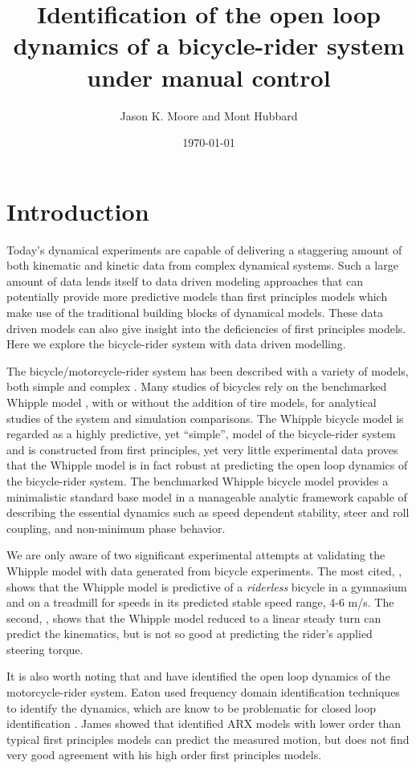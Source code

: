 \documentclass[a4paper]{article}
\title{Identification of the open loop dynamics of a bicycle-rider system under
manual control}
\author{Jason K. Moore and Mont Hubbard}
\date{\today}
\begin{document}
\maketitle

\section{Introduction}

Today's dynamical experiments are capable of delivering a staggering amount of
both kinematic and kinetic data from complex dynamical systems. Such a large
amount of data lends itself to data driven modeling approaches that can
potentially provide more predictive models than first principles models which
make use of the traditional building blocks of dynamical models. These data
driven models can also give insight into the deficiencies of first principles
models. Here we explore the bicycle-rider system with data driven modelling.

The bicycle/motorcycle-rider system has been described with a variety of
models, both simple \cite{Timoshenko1948} and complex \cite{Sharp1971}. Many
studies of bicycles rely on the benchmarked Whipple model \cite{Meijaard2007},
with or without the addition of tire models, for analytical studies of the
system and simulation comparisons. The Whipple bicycle model \cite{Whipple1899}
is regarded as a highly predictive, yet ``simple'', model of the bicycle-rider
system and is constructed from first principles, yet very little experimental
data proves that the Whipple model is in fact robust at predicting the open
loop dynamics of the bicycle-rider system. The benchmarked Whipple bicycle
model \cite{Meijaard2007} provides a minimalistic standard base model in a
manageable analytic framework capable of describing the essential dynamics such
as speed dependent stability, steer and roll coupling, and non-minimum phase
behavior.

We are only aware of two significant experimental attempts at validating the
Whipple model with data generated from bicycle experiments. The most cited,
\cite{Kooijman2008,Kooijman2009}, shows that the Whipple model is predictive of
a \emph{riderless} bicycle in a gymnasium and on a treadmill for speeds in its
predicted stable speed range, 4-6 m/s. The second, \cite{Cain2012}, shows that
the Whipple model reduced to a linear steady turn can predict the kinematics,
but is not so good at predicting the rider's applied steering torque.

It is also worth noting that \cite{Eaton1973} and \cite{James2002,James2005}
have identified the open loop dynamics of the motorcycle-rider system. Eaton
used frequency domain identification techniques to identify the dynamics, which
are know to be problematic for closed loop identification \cite{Ljung1999}.
James showed that identified ARX models with lower order than typical first
principles models can predict the measured motion, but does not find very good
agreement with his high order first principles models.
\end{document}
